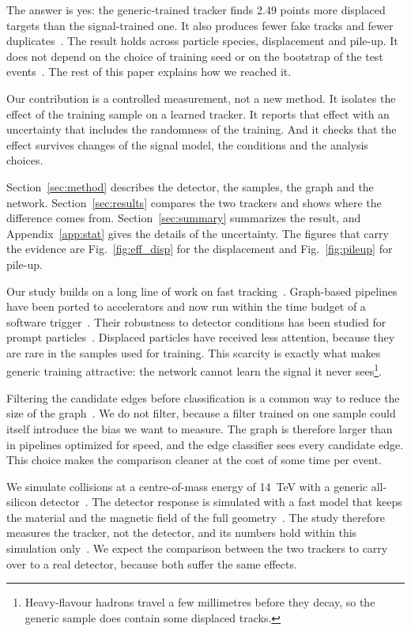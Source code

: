 The answer is yes: the generic-trained tracker finds 2.49 points more displaced targets than the signal-trained one.
It also produces fewer fake tracks and fewer duplicates~\cite{Jensen2011Calibration}.
The result holds across particle species, displacement and pile-up.
It does not depend on the choice of training seed or on the bootstrap of the test events~\cite{Novak2023Bootstrap,Usman2011Seeds}.
The rest of this paper explains how we reached it.

Our contribution is a controlled measurement, not a new method.
It isolates the effect of the training sample on a learned tracker.
It reports that effect with an uncertainty that includes the randomness of the training.
And it checks that the effect survives changes of the signal model, the conditions and the analysis choices.

Section~\ref{sec:method} describes the detector, the samples, the graph and the network.
Section~\ref{sec:results} compares the two trackers and shows where the difference comes from.
Section~\ref{sec:summary} summarizes the result, and Appendix~\ref{app:stat} gives the details of the uncertainty.
The figures that carry the evidence are Fig.~\ref{fig:eff_disp} for the displacement and Fig.~\ref{fig:pileup} for pile-up.

Our study builds on a long line of work on fast tracking~\cite{Xu2010Hough,Esposito2015Cellular,Quinn2022Trigger}.
Graph-based pipelines have been ported to accelerators and now run within the time budget of a software trigger~\cite{Ito2021GPU,Petrov2009Inference}.
Their robustness to detector conditions has been studied for prompt particles~\cite{Hansen2008Robustness}.
Displaced particles have received less attention, because they are rare in the samples used for training.
This scarcity is exactly what makes generic training attractive: the network cannot learn the signal it never sees\footnote{Heavy-flavour hadrons travel a few millimetres before they decay, so the generic sample does contain some displaced tracks.}.

Filtering the candidate edges before classification is a common way to reduce the size of the graph~\cite{Garcia2018Filtering}.
We do not filter, because a filter trained on one sample could itself introduce the bias we want to measure.
The graph is therefore larger than in pipelines optimized for speed, and the edge classifier sees every candidate edge.
This choice makes the comparison cleaner at the cost of some time per event.

We simulate collisions at a centre-of-mass energy of 14~TeV with a generic all-silicon detector~\cite{Abe2009ACTS,Dubois2019Pythia}.
The detector response is simulated with a fast model that keeps the material and the magnetic field of the full geometry~\cite{Weber2014Geant,Kowalski2024Delphes}.
The study therefore measures the tracker, not the detector, and its numbers hold within this simulation only~\cite{Yilmaz2017Material,Rossi2012Resolution}.
We expect the comparison between the two trackers to carry over to a real detector, because both suffer the same effects.

